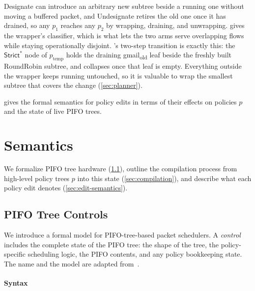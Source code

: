 \documentclass[sigplan,anonymous,review,nonacm]{acmart}
\newcommand{\Strictstar}{\textsf{Strict}^{*}}
\newcommand{\RR}{\textsf{RoundRobin}}
\newcommand{\Designate}{\textsf{Designate}}
\newcommand{\Undesignate}{\textsf{Undesignate}}
\begin{document}
\Designate{} can introduce an arbitrary new subtree beside a running one without moving a buffered packet, and \Undesignate{} retires the old one once it has drained, so any \(p_1\) reaches any \(p_2\) by wrapping, draining, and unwrapping.
 gives the wrapper's classifier, which is what lets the two arms serve overlapping flows while staying operationally disjoint.
's two-step transition is exactly this: the \(\Strictstar\) node of \(p_\text{temp}\) holds the draining \textsf{gmail}\textsubscript{old} leaf beside the freshly built \RR{} subtree, and collapses once that leaf is empty.
Everything outside the wrapper keeps running untouched, so it is valuable to wrap the smallest subtree that covers the change (\cref{sec:planner}).

 gives the formal semantics for policy edits in terms of their effects on policies $p$ and the state of live PIFO trees.

\section{Semantics}\label{sec:semantics}

We formalize PIFO tree hardware (\cref{sec:controls}),
outline the compilation process from high-level policy trees $p$ into this state (\cref{sec:compilation}),
and describe what each policy edit denotes (\cref{sec:edit-semantics}).

\subsection{PIFO Tree Controls}\label{sec:controls}

We introduce a formal model for PIFO-tree-based packet schedulers.
A \emph{control} includes the complete state of the PIFO tree:
the shape of the tree,
the policy-specific scheduling logic,
the PIFO contents,
and any policy bookkeeping state.
The name and the model are adapted from~\citet{Mohan23}.

\paragraph{Syntax}
\end{document}
